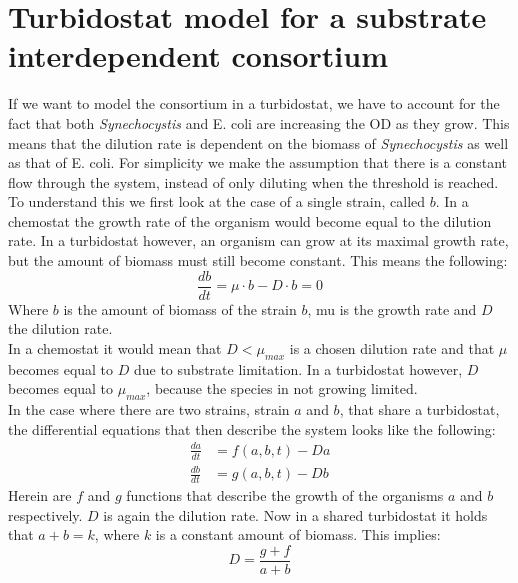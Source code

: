 \documentclass[10pt]{report}
\begin{document}
\section{Turbidostat model for a substrate interdependent consortium}\label{sec:turb}
If we want to model the consortium in a turbidostat, we have to account for the fact that both \textit{Synechocystis} and E. coli are increasing the OD as they grow. This means that the dilution rate is dependent on the biomass of \textit{Synechocystis} as well as that of E. coli.
For simplicity we make the assumption that there is a constant flow through the system, instead of only diluting when the threshold is reached.  To understand this we first look at the case of a single strain, called $b$. In a chemostat the growth rate of the organism would become equal to the dilution rate. In a turbidostat however, an organism can grow at its maximal growth rate, but the amount of biomass must still become constant. This means the following:
\begin{equation}
 \frac{db}{dt} = \mu \cdot b - D \cdot b = 0
\end{equation}
Where $b$ is the amount of biomass of the strain $b$, mu is the growth rate and $D$ the dilution rate.\\
In a chemostat it would mean that $D<\mu_{max}$ is a chosen dilution rate and that $\mu$ becomes equal to $D$ due to substrate limitation. In a turbidostat however, $D$ becomes equal to $\mu_{max}$, because the species in not growing limited.\\
In the case where there are two strains, strain $a$ and $b$, that share a turbidostat, the differential equations that then describe the system looks like the following:
\begin{align}
 \frac{da}{dt} &= f(a,b,t) - Da\\
 \frac{db}{dt} &= g(a,b,t) - Db
\end{align}
Herein are $f$ and $g$ functions that describe the growth of the organisms $a$ and $b$ respectively. $D$ is again the dilution rate. Now in a shared turbidostat it holds that $a+b=k$, where $k$ is a constant amount of biomass. This implies: 
\begin{equation}
 D = \frac{g + f}{a+b}
\end{equation}
\end{document}
